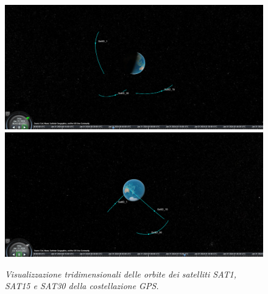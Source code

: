 \documentclass[a4paper,11pt,twoside]{book}
\begin{document}
	\begin{figure}[H]
		\centering
	    {{\includegraphics[scale=0.27]{"Immagini workbook/Immagini esp2/gps3d1"}}}
		\qquad
		{{\includegraphics[scale=0.27]{"Immagini workbook/Immagini esp2/gps3d2"} }}
		\vspace{-0.3cm}
		\caption{\textit{Visualizzazione tridimensionali delle orbite dei satelliti SAT1, SAT15 e SAT30 della costellazione GPS.}}
		\label{gpssc}
	\end{figure}
\end{document}
